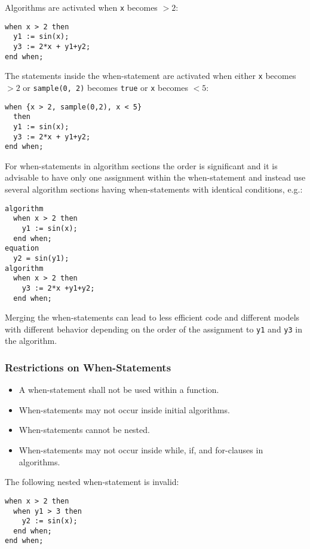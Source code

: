 \begin{example}
Algorithms are activated when \lstinline!x! becomes $> 2$:
\begin{lstlisting}[language=modelica]
when x > 2 then
  y1 := sin(x);
  y3 := 2*x + y1+y2;
end when;
\end{lstlisting}
The statements inside the when-statement are activated when either \lstinline!x! becomes $> 2$ or
\lstinline!sample(0, 2)! becomes \lstinline!true! or \lstinline!x! becomes $< 5$:
\begin{lstlisting}[language=modelica]
when {x > 2, sample(0,2), x < 5}
  then
  y1 := sin(x);
  y3 := 2*x + y1+y2;
end when;
\end{lstlisting}
For when-statements in algorithm sections the order is significant
and it is advisable to have only one assignment within the
when-statement and instead use several algorithm sections having
when-statements with identical conditions, e.g.:
\begin{lstlisting}[language=modelica]
algorithm
  when x > 2 then
    y1 := sin(x);
  end when;
equation
  y2 = sin(y1);
algorithm
  when x > 2 then
    y3 := 2*x +y1+y2;
  end when;
\end{lstlisting}
Merging the when-statements can lead to less efficient code and
different models with different behavior depending on the order of the
assignment to \lstinline!y1! and \lstinline!y3! in the algorithm.
\end{example}

\subsubsection{Restrictions on When-Statements}

\begin{itemize}
\item
  A when-statement shall not be used within a function.
\item
  When-statements may not occur inside initial algorithms.
\item
  When-statements cannot be nested.
\item
  When-statements may not occur inside while, if, and for-clauses in
  algorithms.
\end{itemize}

\begin{example}
The following nested when-statement is invalid:
\begin{lstlisting}[language=modelica]
when x > 2 then
  when y1 > 3 then
    y2 := sin(x);
  end when;
end when;
\end{lstlisting}
\end{example}

